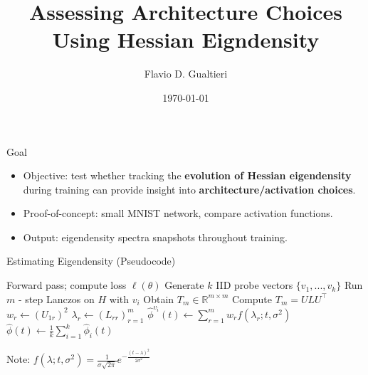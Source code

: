 \documentclass[11pt]{beamer}
\title{Assessing Architecture Choices Using Hessian Eigndensity}
\date{\today}
\author{Flavio D. Gualtieri}
\begin{document}
\begin{frame}
  \titlepage
\end{frame}


\begin{frame}{Goal}
    \begin{itemize}
      \item Objective: test whether tracking the \textbf{evolution of Hessian eigendensity} during training
      can provide insight into \textbf{architecture/activation choices}.
      \item Proof-of-concept: small MNIST network, compare activation functions.
      \item Output: eigendensity spectra snapshots throughout training.
    \end{itemize}
\end{frame}


\begin{frame}{Estimating Eigendensity (Pseudocode)}
    \begin{algorithmic}
        \State Forward pass; compute loss $\ell(\theta)$
        \State Generate $k$ IID probe vectors $\{v_1, ..., v_k\}$
            \State Run $m$ - step Lanczos on $H$ with $v_i$
            \State Obtain $T_m \in \mathbb{R}^{m\times m}$
            \State Compute $T_m = ULU^\top$
                \State $w_r \gets (U_{1r})^2$
                \State $\lambda_r \gets (L_{rr})^m_{r=1}$
            \EndFor
            \State $\hat{\phi}^{v_i}(t) \gets \sum_{r=1}^m w_r f(\lambda_r;t,\sigma^2)$
        \EndFor
        \State $\hat{\phi}(t) \gets \frac{1}{k}\sum_{i=1}^k \hat{\phi}_i(t)$
    \end{algorithmic}

    \vspace{0.2em}
    \footnotesize
    Note: $f(\lambda; t, \sigma^2) = \frac{1}{\sigma\sqrt{2\pi}}e^{-\frac{(t-\lambda)^2}{2\sigma^2}}$
\end{frame}
\end{document}
